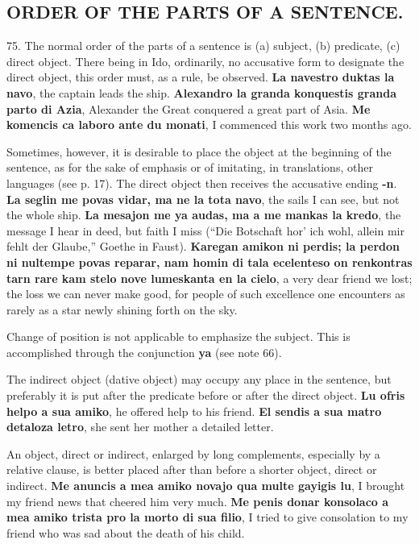 \subsection*{ORDER OF THE PARTS OF A SENTENCE.}
75. The normal order of the parts of a sentence is (a) subject, (b) predicate, (c) direct object. There being in Ido, ordinarily, no accusative form to designate the direct object, this order must, as a rule, be observed. \textbf{La navestro duktas la navo}, the captain leads the ship. \textbf{Alexandro la granda konquestis granda parto di Azia}, Alexander the Great conquered a great part of Asia. \textbf{Me komencis ca laboro ante du monati}, I commenced this work two months ago. 

Sometimes, however, it is desirable to place the object at the beginning of the sentence, as for the sake of emphasis or of imitating, in translations, other languages (see p. 17). The direct object then receives the accusative ending \textbf{-n}. \textbf{La seglin me povas vidar, ma ne la tota navo}, the sails I can see, but not the whole ship. \textbf{La mesajon me ya audas, ma a me mankas la kredo}, the message I hear in deed, but faith I miss (``Die Botschaft hor' ich wohl, allein mir fehlt der Glaube,'' Goethe in Faust). \textbf{Karegan amikon ni perdis; la perdon ni nultempe povas reparar, nam homin di tala ecelenteso on renkontras tarn rare kam stelo nove lumeskanta en la cielo}, a very dear friend we lost; the loss we can never make good, for people of such excellence one encounters as rarely as a star newly shining forth on the sky. 

Change of position is not applicable to emphasize the subject. This is accomplished through the conjunction \textbf{ya} (see note 66). 

The indirect object (dative object) may occupy any place in the sentence, but preferably it is put after the predicate before or after the direct object. \textbf{Lu ofris helpo a sua amiko}, he offered help to his friend. \textbf{El sendis a sua matro detaloza letro}, she sent her mother a detailed letter. 

An object, direct or indirect, enlarged by long complements, especially by a relative clause, is better placed after than before a shorter object, direct or indirect. \textbf{Me anuncis a mea amiko novajo qua multe gayigis lu}, I brought my friend news that cheered him very much. \textbf{Me penis donar konsolaco a mea amiko trista pro la morto di sua filio}, I tried to give consolation to my friend who was sad about the death of his child. 

